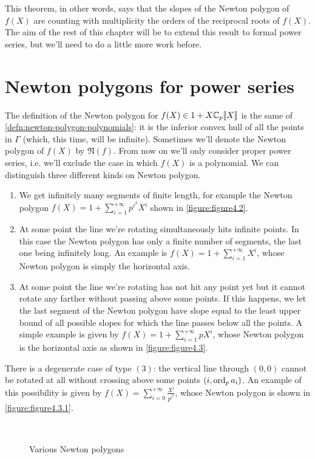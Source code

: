 		This theorem, in other words, says that the slopes of the Newton polygon of $f(X)$ are counting with multiplicity the \padic orders of the reciprocal roots of $f(X)$. The aim of the rest of this chapter will be to extend this result to formal power series, but we'll need to do a little more work before. 
	\section{Newton polygons for power series}
		The definition of the Newton polygon for $f(X) \in 1 + X\mathbb{C}_p\llbracket {X} \rrbracket$ is the same of \cref{defn:newton-polygon-polynomials}: it is the inferior convex hull of all the points in $\Gamma$ (which, this time, will be infinite). Sometimes we'll denote the Newton polygon of $f(X)$ by $\mathfrak{N}(f)$. From now on we'll only consider proper power series, i.e. we'll exclude the case in which $f(X)$ is a polynomial. We can distinguish three different kinds on Newton polygon.
		\begin{enumerate}[label=(\arabic*)]
			\label{enumerate:newton-polygon-types}
			\item We get infinitely many segments of finite length, for example the Newton polygon $f(X) = 1 + \sum_{i=1}^{+\infty} p^{i^2}X^i$ shown in \cref{figure:figure4.2}.
			\item At some point the line we're rotating simultaneously hits infinite points. In this case the Newton polygon has only a finite number of segments, the last one being infinitely long. An example is $f(X) = 1 + \sum_{i=1}^{+\infty} X^i$, whose Newton polygon is simply the horizontal axis.
			\item At some point the line we're rotating has not hit any point yet but it cannot rotate any farther without passing above some points. If this happens, we let the last segment of the Newton polygon have slope equal to the least upper bound of all possible slopes for which the line passes below all the points. A simple example is given by $f(X) = 1 + \sum_{i=1}^{+\infty} pX^i$, whose Newton polygon is the horizontal axis as shown in \cref{figure:figure4.3}.
		\end{enumerate}
		There is a degenerate case of type $(3)$: the vertical line through $(0,0)$ cannot be rotated at all without crossing above some points $(i, \textrm{ord}_p\, a_i)$. An example of this possibility is given by $f(X) = \sum_{i=0}^{+\infty} \tfrac{X^i}{p^{i^2}}$, whose Newton polygon is shown in \cref{figure:figure4.3.1}.
		\begin{figure}
			\centering
			 \qquad \qquad
			 \\
			 \qquad \qquad
			\caption{Various Newton polygons}		
		\end{figure}
